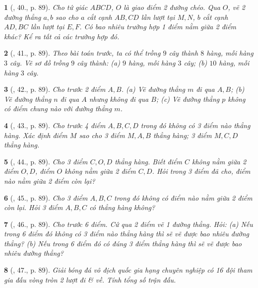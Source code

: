 \documentclass{article}
\newtheorem{baitoan}{}
\begin{document}
\begin{baitoan}[\cite{Tuyen_Toan_6}, 40., p. 89]
	Cho tứ giác $ABCD$, $O$ là giao điểm 2 đường chéo. Qua $O$, vẽ 2 đường thẳng $a,b$ sao cho $a$ cắt cạnh $AB,CD$ lần lượt tại $M,N$, $b$ cắt cạnh $AD,BC$ lần lượt tại $E,F$. Có bao nhiêu trường hợp 1 điểm nằm giữa 2 điểm khác? Kể ra tất cả các trường hợp đó.
\end{baitoan}

\begin{baitoan}[\cite{Tuyen_Toan_6}, 41., p. 89]
	Theo bài toán trước, ta có thể trồng $9$ cây thành $8$ hàng, mỗi hàng $3$ cây. Vẽ sơ đồ trồng $9$ cây thành: (a) $9$ hàng, mỗi hàng $3$ cây; (b) $10$ hàng, mỗi hàng $3$ cây.
\end{baitoan}

\begin{baitoan}[\cite{Tuyen_Toan_6}, 42., p. 89]
	Cho trước 2 điểm $A,B$. (a) Vẽ đường thẳng $m$ đi qua $A,B$; (b) Vẽ đường thẳng $n$ đi qua $A$ nhưng không đi qua $B$; (c) Vẽ đường thẳng $p$ không có điểm chung nào với đường thẳng $m$.
\end{baitoan}

\begin{baitoan}[\cite{Tuyen_Toan_6}, 43., p. 89]
	Cho trước 4 điểm $A,B,C,D$ trong đó không có 3 điểm nào thẳng hàng. Xác định điểm $M$ sao cho 3 điểm $M,A,B$ thẳng hàng; 3 điểm $M,C,D$ thẳng hàng.
\end{baitoan}

\begin{baitoan}[\cite{Tuyen_Toan_6}, 44., p. 89]
	Cho 3 điểm $C,O,D$ thẳng hàng. Biết điểm $C$ không nằm giữa 2 điểm $O,D$, điểm $O$ không nằm giữa 2 điểm $C,D$. Hỏi trong 3 điểm đã cho, điểm nào nằm giữa 2 điểm còn lại?
\end{baitoan}

\begin{baitoan}[\cite{Tuyen_Toan_6}, 45., p. 89]
	Cho 3 điểm $A,B,C$ trong đó không có điểm nào nằm giữa 2 điểm còn lại. Hỏi 3 điểm $A,B,C$ có thẳng hàng không?
\end{baitoan}

\begin{baitoan}[\cite{Tuyen_Toan_6}, 46., p. 89]
	Cho trước 6 điểm. Cứ qua 2 điểm vẽ 1 đường thẳng. Hỏi: (a) Nếu trong 6 điểm đó không có 3 điểm nào thẳng hàng thì sẽ vẽ được bao nhiêu đường thẳng? (b) Nếu trong 6 điểm đó có đúng 3 điểm thẳng hàng thì sẽ vẽ được bao nhiêu đường thẳng?
\end{baitoan}

\begin{baitoan}[\cite{Tuyen_Toan_6}, 47., p. 89]
	Giải bóng đá vô địch quốc gia hạng chuyên nghiệp có 16 đội tham gia đấu vòng tròn 2 lượt đi \& về. Tính tổng số trận đấu.
\end{baitoan}
\end{document}
